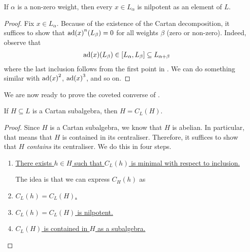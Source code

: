 \begin{corollary}
    If $\alpha$ is a non-zero weight, then every $x \in L_{\alpha}$ is nilpotent as an element of $L$.
\end{corollary}
\begin{proof}
    Fix $x \in L_{\alpha}$. Because of the existence of the Cartan decomposition, it suffices to show that $\operatorname{ad}\!\left( x \right)^n\!\left( L_{\beta} \right) = 0$ for all weights $\beta$ (zero or non-zero). Indeed, observe that
    \begin{align*}
        \operatorname{ad}\!\left( x \right)\!\left( L_{\beta} \right) \in \left[ L_{\alpha}, L_{\beta} \right] \subseteq L_{\alpha + \beta}
    \end{align*}
    where the last inclusion follows from the first point in . We can do something similar with $\operatorname{ad}\!\left( x \right)^2$, $\operatorname{ad}\!\left( x \right)^3$, and so on. \sorry %
\end{proof}

We are now ready to prove the coveted converse of .

\begin{boxtheorem}
    If $H \subseteq L$ is a Cartan subalgebra, then $H = C_L(H)$.
\end{boxtheorem}
\begin{proof}
    Since $H$ is a Cartan subalgebra, we know that $H$ is abelian. In particular, that means that $H$ is contained in its centraliser. Therefore, it suffices to show that $H$ \emph{contains} its centraliser. We do this in four steps.
    \begin{enumerate}
        \item\underline{There exists $h \in H$ such that $C_L(h)$ is minimal with respect to inclusion.}
        
        The idea is that we can express $C_H(h)$ as

        \item\underline{$C_L(h) = C_L(H)$.}

        \item\underline{$C_L(h) = C_L(H)$ is nilpotent.}

        \item\underline{$C_L(H)$ is contained in $H$ as a subalgebra.}
    \end{enumerate}
\end{proof}

